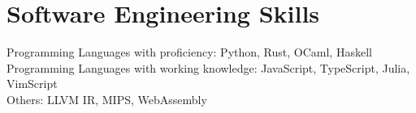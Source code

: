 \documentclass{cv}
\begin{document}
\section*{Software Engineering Skills}
\begin{adjustwidth}{0.5in}{}
  Programming Languages with proficiency: Python, Rust, OCaml, Haskell \\
  Programming Languages with working knowledge: JavaScript, TypeScript, Julia, VimScript \\
  Others: LLVM IR, MIPS, WebAssembly
\end{adjustwidth}

\begin{refsection}[papers]
  \nocite{*}
  \printbibliography[title=Peer Reviewed Publications]
\end{refsection}

\begin{refsection}[talks]
  \nocite{*}
  \printbibliography[title=Talks and Presentations]
\end{refsection}
\end{document}

